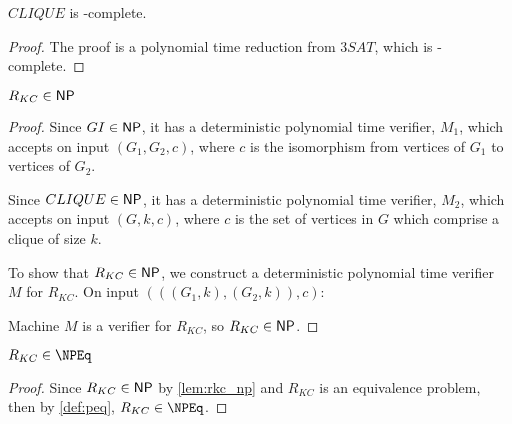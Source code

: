 \begin{lemma}$CLIQUE$ is \NP-complete.\end{lemma}
\begin{proof}
  The proof is a polynomial time reduction from $3SAT$, which is \NP-complete.
\end{proof}

\begin{lemma}\label{lem:rkc_np}$R_{KC}\in{\ensuremath{\mathsf{NP}}}$\end{lemma}
\begin{proof}
  Since $GI\in{\ensuremath{\mathsf{NP}}}$, it has a deterministic polynomial time verifier, $M_1$,
  which accepts on input $(G_1, G_2, c)$, where $c$ is the isomorphism from
  vertices of $G_1$ to vertices of $G_2$.

  Since $CLIQUE\in{\ensuremath{\mathsf{NP}}}$, it has a deterministic polynomial time verifier, $M_2$,
  which accepts on input $(G, k, c)$, where $c$ is the set of vertices in $G$
  which comprise a clique of size $k$.

  To show that $R_{KC}\in{\ensuremath{\mathsf{NP}}}$, we construct a deterministic polynomial time
  verifier $M$ for $R_{KC}$. On input $(((G_1, k), (G_2, k)), c)$:\\
  \begin{algorithm}[H]
  \end{algorithm}
  
  Machine $M$ is a verifier for $R_{KC}$, so $R_{KC}\in{\ensuremath{\mathsf{NP}}}$.
\end{proof}

\begin{corollary}\label{cor:rkc_npeq}$R_{KC}\in\NPEq$\end{corollary}
\begin{proof}
  Since $R_{KC}\in{\ensuremath{\mathsf{NP}}}$ by \autoref{lem:rkc_np} and $R_{KC}$ is an equivalence
  problem, then by \autoref{def:peq}, $R_{KC}\in\NPEq$.
\end{proof}

